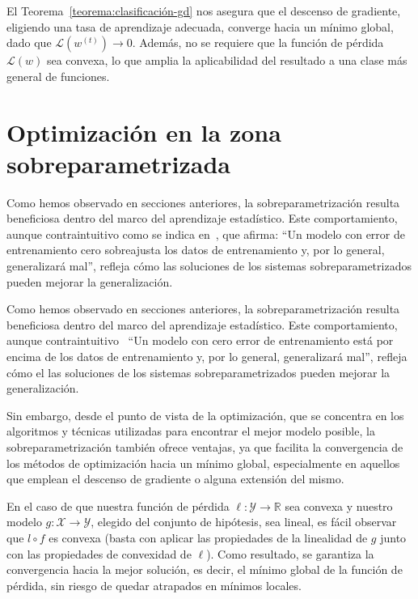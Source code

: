 El Teorema~\ref{teorema:clasificación-gd} nos asegura que el descenso de gradiente, eligiendo una tasa de aprendizaje adecuada, converge hacia un mínimo global, dado que $\mathcal{L}(w^{(t)}) \to 0$. Además, no se requiere que la función de pérdida $\mathcal{L}(w)$ sea convexa, lo que amplia la aplicabilidad del resultado a una clase más general de funciones.\newline

\section{Optimización en la zona sobreparametrizada}\label{sec:optimizacion-zona-sobreparametrizada}

Como hemos observado en secciones anteriores, la sobreparametrización resulta beneficiosa dentro del marco del aprendizaje estadístico. Este comportamiento, aunque contraintuitivo como se indica en~\cite{Hastie2001}, que afirma: ``Un modelo con error de entrenamiento cero sobreajusta los datos de entrenamiento y, por lo general, generalizará mal'', refleja cómo las soluciones de los sistemas sobreparametrizados pueden mejorar la generalización.\newline

Como hemos observado en secciones anteriores, la sobreparametrización resulta beneficiosa dentro del marco del aprendizaje estadístico. Este comportamiento, aunque contraintuitivo~\cite{Hastie2001} ``Un modelo con cero error de entrenamiento está por encima de los datos de entrenamiento y, por lo general, generalizará mal'', refleja cómo el las soluciones de los sistemas sobreparametrizados pueden mejorar la generalización.\newline

Sin embargo, desde el punto de vista de la optimización, que se concentra en los algoritmos y técnicas utilizadas para encontrar el mejor modelo posible, la sobreparametrización también ofrece ventajas, ya que facilita la convergencia de los métodos de optimización hacia un mínimo global, especialmente en aquellos que emplean el descenso de gradiente o alguna extensión del mismo.\newline

En el caso de que nuestra función de pérdida $\ell: \mathcal{Y} \to \mathbb{R}$ sea convexa y nuestro modelo $g: \mathcal{X} \to \mathcal{Y}$, elegido del conjunto de hipótesis, sea lineal, es fácil observar que $l \circ f$ es convexa (basta con aplicar las propiedades de la linealidad de $g$ junto con las propiedades de convexidad de $\ell$). Como resultado, se garantiza la convergencia hacia la mejor solución, es decir, el mínimo global de la función de pérdida, sin riesgo de quedar atrapados en mínimos locales.\newline

